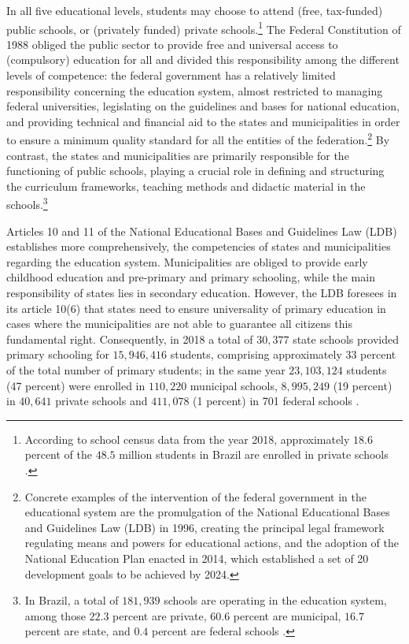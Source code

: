 \documentclass[a4paper, 12pt]{article}
\begin{document}
 
In all five educational levels, students may choose to attend (free, tax-funded) public schools, or (privately funded) private schools.\footnote{According to school census data from the year 2018, approximately $18.6$ percent of the $48.5$ million students in Brazil are enrolled in private schools \citep{Sinopse2018}.} The Federal Constitution of 1988 obliged the public sector to provide free and universal access to (compulsory) education for all and divided this responsibility among the different levels of competence: the federal government has a relatively limited responsibility concerning the education system, almost restricted to managing federal universities, legislating on the guidelines and bases for national education, and providing technical and financial aid to the states and municipalities in order to ensure a minimum quality standard for all the entities of the federation.\footnote{Concrete examples of the intervention of the federal government in the educational system are the promulgation of the National Educational Bases and Guidelines Law (LDB) in 1996, creating the principal legal framework regulating means and powers for educational actions, and the adoption of the National Education Plan enacted in 2014, which established a set of 20 development goals to be achieved by 2024.} By contrast, the states and municipalities are primarily responsible for the functioning of public schools, playing a crucial role in defining and structuring the curriculum frameworks, teaching methods and didactic material in the schools.\footnote{In Brazil, a total of $181,939$ schools are operating in the education system, among those $22.3$ percent are private, $60.6$ percent are municipal, $16.7$ percent are state, and $0.4$ percent are federal schools \citep{Sinopse2018}.}


Articles 10 and 11 of the National Educational Bases and Guidelines Law (LDB) establishes more comprehensively, the competencies of states and municipalities regarding the education system. Municipalities are obliged to provide early childhood education and pre-primary and primary schooling, while the main responsibility of states lies in secondary education. However, the LDB foresees in its article 10(6) that states need to ensure universality of primary education in cases where the municipalities are not able to guarantee all citizens this fundamental right. Consequently, in 2018 a total of $30,377$ state schools provided primary schooling for $15,946,416$ students, comprising approximately 33 percent of the total number of primary students; in the same year $23,103,124$ students (47 percent) were enrolled in $110,220$ municipal schools, $8,995,249$ (19 percent) in $40,641$ private schools and $411,078$ (1 percent) in 701 federal schools \citep{Sinopse2018}. 
\end{document}
